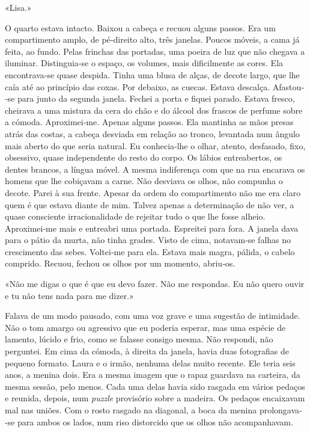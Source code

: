 «Lisa.»

O quarto estava intacto. Baixou a cabeça e recuou alguns passos. Era um
compartimento amplo, de pé­‑direito alto, três janelas. Poucos móveis, a
cama já feita, ao fundo. Pelas frinchas das portadas, uma poeira de luz
que não chegava a iluminar. Distinguia­‑se o espaço, os volumes, mais
dificilmente as cores. Ela encontrava­‑se quase despida. Tinha uma blusa
de alças, de decote largo, que lhe caía até ao princípio das coxas. Por
debaixo, as cuecas. Estava descalça. Afastou­‑se para junto da segunda
janela. Fechei a porta e fiquei parado. Estava fresco, cheirava a uma
mistura da cera do chão e do álcool dos frascos de perfume sobre a
cómoda. Aproximei­‑me. Apenas alguns passos. Ela mantinha as mãos presas
atrás das costas, a cabeça desviada em relação ao tronco, levantada num
ângulo mais aberto do que seria natural. Eu conhecia­‑lhe o olhar,
atento, desfasado, fixo, obsessivo, quase independente do resto do
corpo. Os lábios entreabertos, os dentes brancos, a língua móvel. A
mesma indiferença com que na rua encarava os homens que lhe cobiçavam a
carne. Não desviava os olhos, não compunha o decote. Parei à sua frente.
Apesar da ordem do compartimento não me era claro quem é que estava
diante de mim. Talvez apenas a determinação de não ver, a quase
consciente irracionalidade de rejeitar tudo o que lhe fosse alheio.
Aproximei­‑me mais e entreabri uma portada. Espreitei para fora. A
janela dava para o pátio da murta, não tinha grades. Visto de cima,
notavam­‑se falhas no crescimento das sebes. Voltei­‑me para ela. Estava
mais magra, pálida, o cabelo comprido. Recuou, fechou os olhos por um
momento, abriu­‑os.

«Não me digas o que é que eu devo fazer. Não me respondas. Eu não quero
ouvir e tu não tens nada para me dizer.»

Falava de um modo pausado, com uma voz grave e uma sugestão de
intimidade. Não o tom amargo ou agressivo que eu poderia esperar, mas
uma espécie de lamento, lúcido e frio, como se falasse consigo mesma.
Não respondi, não perguntei. Em cima da cómoda, à direita da janela,
havia duas fotografias de pequeno formato. Laura e o irmão, nenhuma
delas muito recente. Ele teria seis anos, a menina dois. Era a mesma
imagem que o rapaz guardava na carteira, da mesma sessão, pelo menos.
Cada uma delas havia sido rasgada em vários pedaços e reunida, depois,
num \emph{puzzle} provisório sobre a madeira. Os pedaços encaixavam mal
nas uniões. Com o rosto rasgado na diagonal, a boca da menina
prolongava­‑se para ambos os lados, num riso distorcido que os olhos não
acompanhavam.

